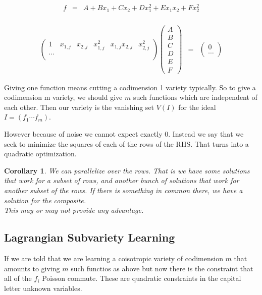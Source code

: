 \documentclass[a4paper,landscape]{article}
\theoremstyle{change}
\newtheorem{cor}[equation]{Corollary}
\theoremstyle{nonumberplain}
\numberwithin{equation}{section}
\begin{document}
\begin{eqnarray*}
f &=& A + B x_1 + C x_2 + D x_1^2 + E x_1 x_2 + F x_2^2\\
\end{eqnarray*}

\begin{eqnarray*}
\begin{pmatrix}
1 & x_{1,j} & x_{2,j} & x_{1,j}^2 & x_{1,j} x_{2,j} & x_{2,j}^2\\
\cdots\\
\end{pmatrix}
\begin{pmatrix}
A\\
B\\
C\\
D\\
E\\
F
\end{pmatrix}
&=&
\begin{pmatrix}
0\\
\cdots
\end{pmatrix}
\end{eqnarray*}

Giving one function means cutting a codimension 1 variety typically. So to give a codimension m variety, we should give $m$ such functions which are independent of each other. Then our variety is the vanishing set $V(I)$ for the ideal $I = (f_1 \cdots f_m)$.

However because of noise we cannot expect exactly $0$. Instead we say that we seek to minimize the squares of each of the rows of the RHS. That turns into a quadratic optimization.

\begin{cor}
We can parallelize over the rows. That is we have some solutions that work for a subset of rows, and another bunch of solutions that work for another subset of the rows. If there is something in common there, we have a solution for the composite.\\
This may or may not provide any advantage.
\end{cor}

\subsection{Lagrangian Subvariety Learning}

If we are told that we are learning a coisotropic variety of codimension $m$ that amounts to giving $m$ such functios as above but now there is the constraint that all of the $f_i$ Poisson commute. These are quadratic constraints in the capital letter unknown variables.
\end{document}
